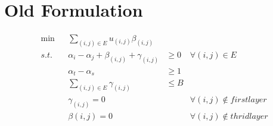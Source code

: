 \documentclass{article}
\begin{document}
\section*{Old Formulation}

\begin{align*}
    \min &  & \sum_{(i,j) \in E} u_{(i,j)}\beta_{(i,j)}            &        &                                  \\
    s.t. &  & \alpha_i - \alpha_j + \beta_{(i,j)} + \gamma_{(i,j)} & \geq 0 & \forall (i,j) \in E              \\
         &  & \alpha_t - \alpha_s                                  & \geq 1 &                                  \\
         &  & \sum_{(i,j) \in E} \gamma_{(i,j)}                    & \leq B &                                  \\
         &  & \gamma_{(i,j)} = 0                                   &        & \forall (i,j) \notin first layer \\
         &  & \beta{(i,j)} = 0                                     &        & \forall (i,j) \notin thrid layer
\end{align*}
\end{document}
